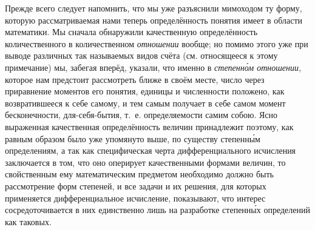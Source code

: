Прежде всего следует напомнить, что мы уже разъяснили мимоходом ту форму,
которую рассматриваемая нами теперь определённость понятия имеет в области
математики. Мы сначала обнаружили качественную определённость количественного в
количественном {\em отношении} вообще; но помимо этого уже при выводе различных
так называемых видов счёта (см. относящееся к этому примечание) мы, забегая
вперёд, указали, что именно в {\em степенн\'{о}м отношении,} которое нам
предстоит рассмотреть ближе в своём месте, число через приравнение моментов его
понятия, единицы и численности положено, как возвратившееся к себе самому, и
тем самым получает в себе самом момент бесконечности, для-себя-бытия, т.~е.
определяемости самим собою. Ясно выраженная качественная определённость величин
принадлежит поэтому, как равным образом было уже упомянуто выше, по существу
степенн\'{ы}м определениям, а так как специфическая черта дифференциального
исчисления заключается в том, что оно оперирует качественными формами величин,
то свойственным ему математическим предметом необходимо должно быть
рассмотрение форм степеней, и все задачи и их решения, для которых применяется
дифференциальное исчисление, показывают, что интерес сосредоточивается в них
единственно лишь на разработке степенн\'{ы}х определений как таковых.

